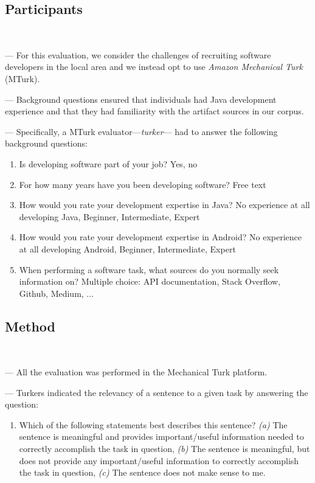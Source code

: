 \subsection{Participants}
\textcolor{white}{force ident} %

--- For this evaluation, we consider the challenges of recruiting software developers in the local area and we instead opt to use 
\textit{Amazon Mechanical Turk}~\cite{mturk} (MTurk).

--- Background questions ensured that individuals had Java development experience and that they had familiarity with the artifact sources in our corpus.

--- Specifically, a MTurk evaluator---\textit{turker}--- had to answer the following background questions:


\begin{enumerate}[leftmargin=\parindent, font=\normalfont\itshape, label=BQ\textsubscript{\arabic*.}]
    \item Is developing software part of your job? Yes, no 
    \item For how many years have you been developing software? Free text
    \item How would you rate your development expertise in Java? No experience at all developing Java, Beginner, Intermediate, Expert
    \item How would you rate your development expertise in Android? No experience at all developing Android, Beginner, Intermediate, Expert
    \item When performing a software task, what sources do you normally seek information on? Multiple choice: API documentation, Stack Overflow, Github, Medium, ...
\end{enumerate}

   

\subsection{Method}
\textcolor{white}{force ident} %


--- All the evaluation was performed in the Mechanical Turk platform. \vspace{3mm}

--- Turkers indicated the relevancy of a sentence to a given task  by answering the question: \vspace{3mm}

\begin{enumerate}[leftmargin=\parindent, font=\normalfont\itshape, label=SR\textsubscript{\arabic*}]
    \item Which of the following statements best describes this sentence? 
    \textit{(a)} The sentence is meaningful and provides important/useful information needed to correctly accomplish the task in question, 
    \textit{(b)} The sentence is meaningful, but does not provide any important/useful information to correctly accomplish the task in question, 
    \textit{(c)} The sentence does not make sense to me.
\end{enumerate}

